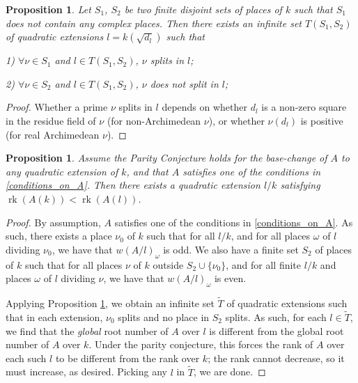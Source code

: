 \documentclass[a4paper,12pt]{amsart}
\newtheorem{proposition}[definition]{Proposition}
\begin{document}
\begin{proposition}\label{prop:splitting}
Let $S_{1}$, $S_{2}$ be two finite disjoint sets of places of $k$ such that $S_{1}$ does not contain any complex places. Then there exists an infinite set  $T(S_1, S_2)$ of quadratic extensions ${l} = k(\sqrt{d_l})$ such that

1) $\forall \nu \in S_{1}$ and ${l} \in T(S_1, S_2)$, $\nu$ splits in ${l}$;

2)  $\forall \nu \in S_{2}$ and ${l} \in T(S_1, S_2)$, $\nu$ does not split in ${l}$; 

\end{proposition}
\begin{proof}
Whether a prime $\nu$ splits in ${l}$ depends on whether $d_{l}$ is a non-zero square in the residue field of $\nu$ (for non-Archimedean $\nu$), or whether $\nu(d_{l})$ is positive (for real Archimedean $\nu$).
\end{proof}

\begin{proposition}
Assume the Parity Conjecture holds for the base-change of $A$ to any quadratic extension of $k$, and that $A$ satisfies one of the conditions in \ref{conditions_on_A}. 
Then there exists a quadratic extension $l/k$ satisfying ${\operatorname{rk}}(A(k)) < {\operatorname{rk}} (A(l))$. 
\end{proposition}
\begin{proof}
By assumption, $A$ satisfies one of the conditions in \ref{conditions_on_A}. As such, there exists a place $\nu_0$ of $k$ such that  for all $l/k$, and for all places $\omega $ of $l$ dividing $\nu_0$, we have that $w(A/l)_{\omega}$ is odd. We also have a finite set $S_2$ of places of $k$ such that for all places $\nu$ of $k$ outside $S_2 \cup \{\nu_0\}$, and for all finite $l/k$ and places $\omega$ of $l$ dividing $\nu$, we have that $w(A/l)_{\omega}$ is even. 

Applying Proposition \ref{prop:splitting}, we obtain an infinite set $\tilde{T}$ of quadratic extensions such that in each extension, $\nu_0$ splits and no place in $S_2$ splits. As such, for each $l \in \tilde{T}$, we find that the \emph{global} root number of $A$ over $l$ is different from the global root number of $A$ over $k$. Under the parity conjecture, this forces the rank of $A$ over each such $l$ to be different from the rank over $k$; the rank cannot decrease, so it must increase, as desired. Picking any $l$ in $\tilde{T}$, we are done. 
\end{proof}
\end{document}
